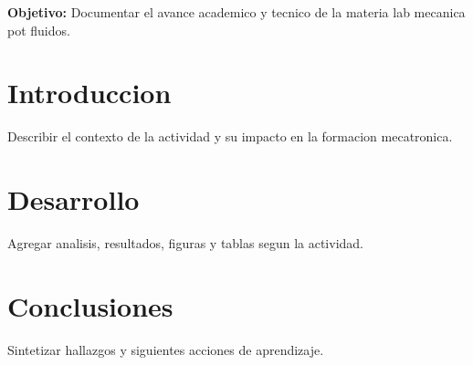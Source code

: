 \documentclass[spanish,letterpaper,oneside]{article}
\begin{document}
\templatePortrait
\templatePagecfg
\onehalfspacing

\begin{abstractd}
\textbf{Objetivo:} Documentar el avance academico y tecnico de la materia lab mecanica pot fluidos.
\end{abstractd}

\templateIndex
\templateFinalcfg

\section{Introduccion}
Describir el contexto de la actividad y su impacto en la formacion mecatronica.

\section{Desarrollo}
Agregar analisis, resultados, figuras y tablas segun la actividad.

\section{Conclusiones}
Sintetizar hallazgos y siguientes acciones de aprendizaje.



\end{document}
